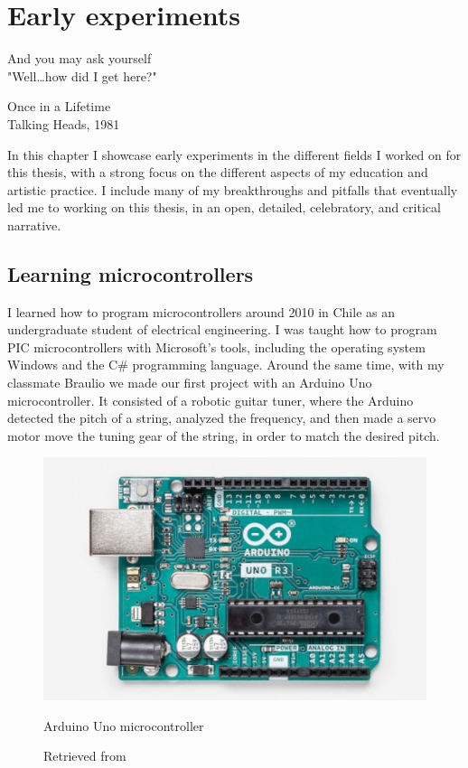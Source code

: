 \chapter{Early experiments}

\epigraph{And you may ask yourself \\ "Well\dots how did I get here?"}{Once in a Lifetime \\ Talking Heads, 1981}

In this chapter I showcase early experiments in the different fields I worked on for this thesis, with a strong focus on the different aspects of my education and artistic practice.  I include many of my breakthroughs and pitfalls that eventually led me to working on this thesis, in an open, detailed, celebratory, and critical narrative.

\section{Learning microcontrollers}

I learned how to program microcontrollers around 2010 in Chile as an undergraduate student of electrical engineering. I was taught how to program PIC microcontrollers with Microsoft's tools, including the operating system Windows and the C\# programming language. Around the same time, with my classmate Braulio we made our first project with an Arduino Uno microcontroller. It consisted of a robotic guitar tuner, where the Arduino detected the pitch of a string, analyzed the frequency, and then made a servo motor move the tuning gear of the string, in order to match the desired pitch.

\begin{figure}[ht]
  \centering
  \includegraphics[width=0.75\linewidth,height=0.25\textheight,keepaspectratio]{images/arduino-uno.jpg}
  \caption{Arduino Uno microcontroller}
  \caption*{Retrieved from \cite{website-arduino-uno}}
  \label{fig:arduino-uno}
\end{figure}

